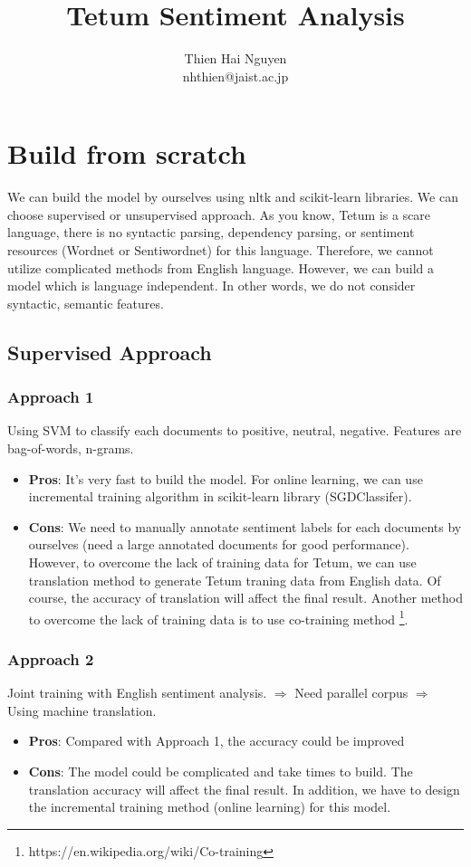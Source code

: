 \documentclass[runningheads,a4paper]{article}
\begin{document}
\title{Tetum Sentiment Analysis}
\author{Thien Hai Nguyen \\ nhthien@jaist.ac.jp}
\maketitle
\section{Build from scratch}
We can build the model by ourselves using nltk and scikit-learn libraries. We can choose supervised or unsupervised approach. As you know, Tetum is a scare language, there is no syntactic parsing, dependency parsing, or sentiment resources (Wordnet or Sentiwordnet) for this language. Therefore, we cannot utilize complicated methods from English language. However, we can build a model which is language independent. In other words, we do not consider syntactic, semantic features.
\subsection{Supervised Approach}
\subsubsection{Approach 1} Using SVM to classify each documents to positive, neutral, negative. Features are bag-of-words, n-grams.
\begin{itemize}
	\item \textbf{Pros}: It's very fast to build the model. For online learning, we can use incremental training algorithm in scikit-learn library (SGDClassifer).
	\item \textbf{Cons}: We need to manually annotate sentiment labels for each documents by ourselves (need a large annotated documents for good performance). However, to overcome the lack of training data for Tetum, we can use translation method to generate Tetum traning data from English data. Of course, the accuracy of translation will affect the final result. Another method to overcome the lack of training data is to use co-training method \footnote{https://en.wikipedia.org/wiki/Co-training}.
\end{itemize}
\subsubsection{Approach 2} Joint training with English sentiment analysis. $\Rightarrow$ Need parallel corpus $\Rightarrow$ Using machine translation.
	\begin{itemize}
		\item \textbf{Pros}: Compared with Approach 1, the accuracy could be improved 
		\item \textbf{Cons}: The model could be complicated and take times to build. The translation accuracy will affect the final result. In addition, we have to design the incremental training method (online learning) for this model.
	\end{itemize}
\end{document}
